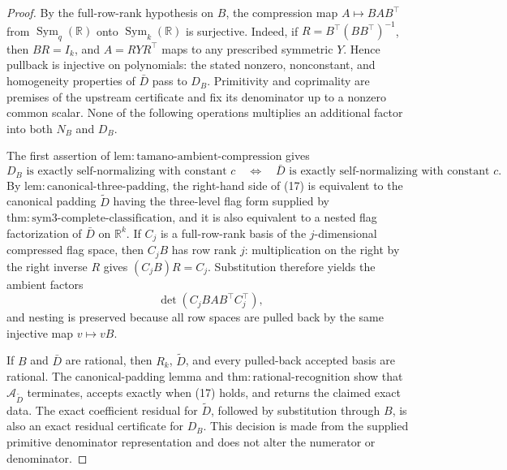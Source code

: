 \documentclass{article}
\begin{document}
\begin{proof}
By the full-row-rank hypothesis on \(B\), the compression map
\(A\mapsto BAB^{\top}\) from
\(\operatorname{Sym}_q(\mathbb R)\) onto
\(\operatorname{Sym}_k(\mathbb R)\) is surjective.  Indeed, if
\(R=B^{\top}(BB^{\top})^{-1}\), then \(BR=I_k\), and
\(A=RYR^{\top}\) maps to any prescribed symmetric \(Y\).  Hence
pullback is injective on polynomials: the stated nonzero, nonconstant,
and homogeneity properties of \(\bar D\) pass to \(D_B\).
Primitivity and coprimality are premises of the upstream certificate and
fix its denominator up to a nonzero common scalar.  None of the following
operations multiplies an additional factor into both \(N_B\) and
\(D_B\).

The first assertion of
\(\mathrm{lem{:}tamano\text{-}ambient\text{-}compression}\) gives
\[
 D_B\text{ is exactly self-normalizing with constant }c
 \quad\Longleftrightarrow\quad
 \bar D\text{ is exactly self-normalizing with constant }c.          \tag{17}
\]
By \(\mathrm{lem{:}canonical\text{-}three\text{-}padding}\), the
right-hand side of (17) is equivalent to the canonical padding
\(\widetilde D\) having the three-level flag form supplied by
\(\mathrm{thm{:}sym3\text{-}complete\text{-}classification}\), and it
is also equivalent to a nested flag factorization of \(\bar D\) on
\(\mathbb R^k\).  If \(C_j\) is a full-row-rank basis of the
\(j\)-dimensional compressed flag space, then \(C_jB\) has row rank
\(j\): multiplication on the right by the right inverse \(R\) gives
\((C_jB)R=C_j\).  Substitution therefore yields the ambient factors
\[
 \det\!\left(C_jB A B^{\top}C_j^{\top}\right),
\]
and nesting is preserved because all row spaces are pulled back by the
same injective map \(v\mapsto vB\).

If \(B\) and \(\bar D\) are rational, then \(R_k\),
\(\widetilde D\), and every pulled-back accepted basis are rational.
The canonical-padding lemma and
\(\mathrm{thm{:}rational\text{-}recognition}\) show that
\(\mathcal A_{\widetilde D}\) terminates, accepts exactly when (17)
holds, and returns the claimed exact data.  The exact coefficient
residual for \(\widetilde D\), followed by substitution through \(B\),
is also an exact residual certificate for \(D_B\).  This decision is
made from the supplied primitive denominator representation and does
not alter the numerator or denominator.


\end{proof}
\end{document}
